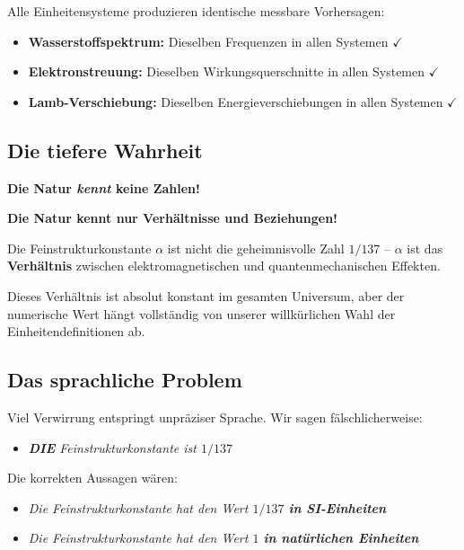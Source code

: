 	\begin{theorem}
		Alle Einheitensysteme produzieren identische messbare Vorhersagen:
		\begin{itemize}
			\item \textbf{Wasserstoffspektrum:} Dieselben Frequenzen in allen Systemen $\checkmark$
			\item \textbf{Elektronstreuung:} Dieselben Wirkungsquerschnitte in allen Systemen $\checkmark$
			\item \textbf{Lamb-Verschiebung:} Dieselben Energieverschiebungen in allen Systemen $\checkmark$
		\end{itemize}
	\end{theorem}
	
	\subsection{Die tiefere Wahrheit}
	
	\begin{tcolorbox}[colback=green!5!white,colframe=green!75!black,title=Naturs wahre Sprache]
		\textbf{Die Natur \textit{kennt} keine Zahlen!}
		
		\textbf{Die Natur kennt nur Verhältnisse und Beziehungen!}
	\end{tcolorbox}
	
	Die Feinstrukturkonstante $\alpha$ ist nicht die geheimnisvolle Zahl \textit{$1/137$} -- $\alpha$ ist das \textbf{Verhältnis} zwischen elektromagnetischen und quantenmechanischen Effekten.
	
	Dieses Verhältnis ist absolut konstant im gesamten Universum, aber der numerische Wert hängt vollständig von unserer willkürlichen Wahl der Einheitendefinitionen ab.
	
	\subsection{Das sprachliche Problem}
	
	Viel Verwirrung entspringt unpräziser Sprache. Wir sagen fälschlicherweise:
	\begin{itemize}
		\item[\textcolor{red}{$\times$}] \textit{\textbf{DIE} Feinstrukturkonstante ist $1/137$}
	\end{itemize}
	
	Die korrekten Aussagen wären:
	\begin{itemize}
		\item[\textcolor{green}{$\checkmark$}] \textit{Die Feinstrukturkonstante hat den Wert $1/137$ \textbf{in SI-Einheiten}}
		\item[\textcolor{green}{$\checkmark$}] \textit{Die Feinstrukturkonstante hat den Wert $1$ \textbf{in natürlichen Einheiten}}
	\end{itemize}
	
